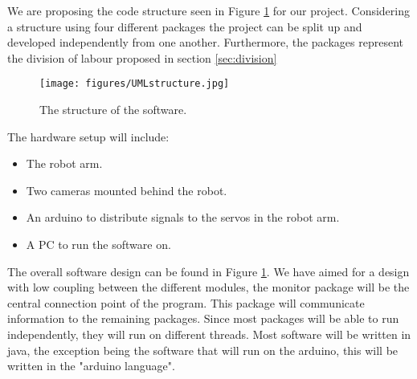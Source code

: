 We are proposing the code structure seen in Figure \ref{fig:uml} for our project. Considering a structure using four different packages the project can be split up and developed independently from one another. Furthermore, the packages represent the division of labour proposed in section \ref{sec:division}

\begin{figure}[H] 
	\centering
	\texttt{[image: figures/UMLstructure.jpg]}
    \caption{The structure of the software.}
    \label{fig:uml}
\end{figure}

\noindent
The hardware setup will include:
\begin{itemize}
\item The robot arm.
\item Two cameras mounted behind the robot.
\item An arduino to distribute signals to the servos in the robot arm.
\item A PC to run the software on.
\end{itemize}
The overall software design can be found in Figure \ref{fig:uml}. We have aimed for a design with low coupling between the different modules, the monitor package will be the central connection point of the program. This package will communicate information to the remaining packages. Since most packages will be able to run independently, they will run on different threads. Most software will be written in java, the exception being the software that will run on the arduino, this will be written in the "arduino language".
